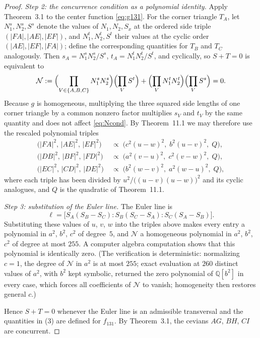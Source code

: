 \documentclass[12pt,a4paper]{amsart}
\theoremstyle{remark}
\begin{document}
{\begin{proof}
\emph{Step 2: the concurrence condition as a polynomial identity.}
Apply Theorem~3.1 to the center function \eqref{eq:g131}.  For the
corner triangle $T_A$, let $N_1^{s},N_2^{s},S^{s}$ denote the values of
$N_1,N_2,S_x$ at the ordered side triple $(|FA|,|AE|,|EF|)$, and
$N_1^{t},N_2^{t},S^{t}$ their values at the cyclic order
$(|AE|,|EF|,|FA|)$; define the corresponding quantities for $T_B$ and
$T_C$ analogously.  Then $s_A=N_1^{s}N_2^{s}/S^{s}$,
$t_A=N_1^{t}N_2^{t}/S^{t}$, and cyclically, so $S+T=0$ is equivalent to
\begin{equation}\label{eq:Ncond}
\mathcal N:=
\Bigl(\prod_{V\in\{A,B,C\}}N_1^{s}N_2^{s}\Bigr)
\Bigl(\prod_{V}S^{t}\Bigr)
+
\Bigl(\prod_{V}N_1^{t}N_2^{t}\Bigr)
\Bigl(\prod_{V}S^{s}\Bigr)=0 .
\end{equation}
Because $g$ is homogeneous, multiplying the three squared side lengths
of one corner triangle by a common nonzero factor multiplies $s_V$ and
$t_V$ by the same quantity and does not affect \eqref{eq:Ncond}.  By
Theorem~11.1 we may therefore use the rescaled polynomial triples
\[
\begin{aligned}
\bigl(|FA|^2,\,|AE|^2,\,|EF|^2\bigr)
&\;\propto\;\bigl(c^2(u-w)^2,\;b^2(u-v)^2,\;Q\bigr),\\
\bigl(|DB|^2,\,|BF|^2,\,|FD|^2\bigr)
&\;\propto\;\bigl(a^2(v-u)^2,\;c^2(v-w)^2,\;Q\bigr),\\
\bigl(|EC|^2,\,|CD|^2,\,|DE|^2\bigr)
&\;\propto\;\bigl(b^2(w-v)^2,\;a^2(w-u)^2,\;Q\bigr),
\end{aligned}
\]
where each triple has been divided by
$u^2/\bigl((u-v)(u-w)\bigr)^2$ and its cyclic analogues, and $Q$ is
the quadratic of Theorem~11.1.

\emph{Step 3: substitution of the Euler line.}
The Euler line is
\[
\ell=\bigl[S_A(S_B-S_C):S_B(S_C-S_A):S_C(S_A-S_B)\bigr].
\]
Substituting these values of $u$, $v$, $w$ into the triples above makes
every entry a polynomial in $a^2$, $b^2$, $c^2$ of degree~$5$, and
$\mathcal N$ a homogeneous polynomial in $a^2$, $b^2$, $c^2$ of degree
at most $255$.  A computer algebra computation shows that this
polynomial is identically zero.  (The verification is deterministic:
normalizing $c=1$, the degree of $\mathcal N$ in $a^2$ is at most
$255$; exact evaluation at $260$ distinct values of $a^2$, with $b^2$
kept symbolic, returned the zero polynomial of $\mathbb Q[b^2]$ in
every case, which forces all coefficients of $\mathcal N$ to vanish;
homogeneity then restores general $c$.)

Hence $S+T=0$ whenever the Euler line is an admissible transversal and
the quantities in (3) are defined for $f_{131}$.  By Theorem~3.1, the
cevians $AG$, $BH$, $CI$ are concurrent.
\end{proof}

}
\end{document}
